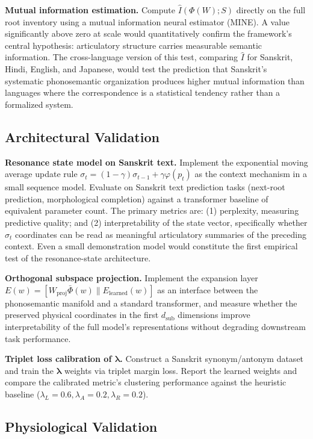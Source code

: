 \documentclass[12pt]{article}
\begin{document}
\textbf{Mutual information estimation.} Compute $\hat{I}(\Phi(W); S)$ directly on the full root inventory using a mutual information neural estimator (MINE). A value significantly above zero at scale would quantitatively confirm the framework's central hypothesis: articulatory structure carries measurable semantic information. The cross-language version of this test, comparing $\hat{I}$ for Sanskrit, Hindi, English, and Japanese, would test the prediction that Sanskrit's systematic phonosemantic organization produces higher mutual information than languages where the correspondence is a statistical tendency rather than a formalized system.

\subsection{Architectural Validation}

\textbf{Resonance state model on Sanskrit text.} Implement the exponential moving average update rule $\sigma_t = (1-\gamma)\sigma_{t-1} + \gamma\varphi(p_t)$ as the context mechanism in a small sequence model. Evaluate on Sanskrit text prediction tasks (next-root prediction, morphological completion) against a transformer baseline of equivalent parameter count. The primary metrics are: (1) perplexity, measuring predictive quality; and (2) interpretability of the state vector, specifically whether $\sigma_t$ coordinates can be read as meaningful articulatory summaries of the preceding context. Even a small demonstration model would constitute the first empirical test of the resonance-state architecture.

\textbf{Orthogonal subspace projection.} Implement the expansion layer $E(w) = [W_{\text{proj}}\bar{\Phi}(w) \parallel E_{\text{learned}}(w)]$ as an interface between the phonosemantic manifold and a standard transformer, and measure whether the preserved physical coordinates in the first $d_{\text{sub}}$ dimensions improve interpretability of the full model's representations without degrading downstream task performance.

\textbf{Triplet loss calibration of $\boldsymbol{\lambda}$.} Construct a Sanskrit synonym/antonym dataset and train the $\boldsymbol{\lambda}$ weights via triplet margin loss. Report the learned weights and compare the calibrated metric's clustering performance against the heuristic baseline ($\lambda_L = 0.6, \lambda_A = 0.2, \lambda_R = 0.2$).

\subsection{Physiological Validation}
\end{document}
